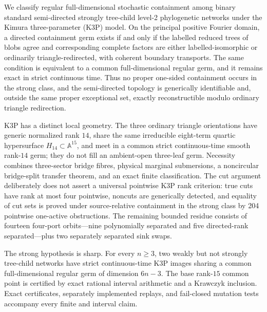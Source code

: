 We classify regular full-dimensional stochastic containment among binary
standard semi-directed strongly tree-child level-2 phylogenetic networks
under the Kimura three-parameter (K3P) model.  On the principal positive
Fourier domain, a directed containment germ exists if and only if the labelled
reduced trees of blobs agree and corresponding complete factors are either
labelled-isomorphic or ordinarily triangle-redirected, with coherent boundary
transports.  The same condition is equivalent to a common
full-dimensional regular germ, and it remains exact in strict continuous
time.  Thus no proper one-sided containment occurs in the strong class, and
the semi-directed topology is generically identifiable and, outside the
same proper exceptional set, exactly reconstructible modulo ordinary
triangle redirection.

K3P has a distinct local geometry.  The three ordinary triangle orientations
have generic normalized rank \(14\), share the same irreducible eight-term
quartic hypersurface \(H_{14}\subset\mathbb A^{15}\), and meet in a common
strict continuous-time smooth rank-\(14\) germ; they do not fill an
ambient-open three-leaf germ.  Necessity combines three-sector bridge fibres,
physical marginal submersions, a noncircular bridge-split transfer theorem,
and an exact finite classification.  The cut argument deliberately does not
assert a universal pointwise K3P rank criterion: true cuts have rank at most
four pointwise, noncuts are generically detected, and equality of cut sets is
proved under source-relative containment in the strong class by 204
pointwise one-active obstructions.  The remaining bounded residue consists
of fourteen four-port orbits---nine polynomially separated and five
directed-rank separated---plus two separately separated sink swaps.

The strong hypothesis is sharp.  For every \(n\ge3\), two weakly but not
strongly tree-child networks have strict continuous-time K3P images sharing
a common full-dimensional regular germ of dimension \(6n-3\).  The base
rank-\(15\) common point is certified by exact rational interval arithmetic
and a Krawczyk inclusion.  Exact certificates, separately implemented
replays, and fail-closed mutation tests accompany every finite and interval
claim.
